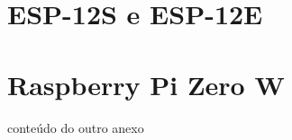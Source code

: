 
\begin{anexosenv}
\partanexos

\chapter{ESP-12S e ESP-12E}     %
\label{chap:anexoA}





\chapter{Raspberry Pi Zero W}
\label{chap:anexoB}

conteúdo do outro anexo

\end{anexosenv}
